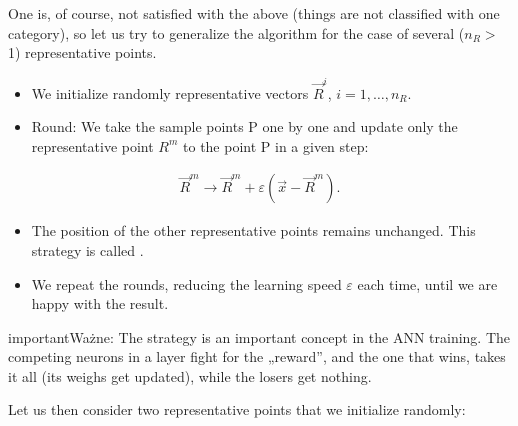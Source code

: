 \documentclass[a4paper,12pt,polish]{jupyterBook}
\begin{document}
\sphinxAtStartPar
One is, of course, not satisfied with the above (things are not classified with one category), so let us try to generalize the algorithm for the case of several (\( n_R> \) 1) representative points.
\begin{itemize}
\item {} 
\sphinxAtStartPar
We initialize randomly representative vectors \( \vec{R}^i \), \(i = 1, \dots, n_R \).

\item {} 
\sphinxAtStartPar
Round: We take the sample points P one by one and update only the  representative point \(R^m\) to the point P in a given step:

\end{itemize}
\begin{equation*}
\begin{split} \vec{R}^m \to \vec{R}^m + \varepsilon (\vec{x} - \vec{R}^m). \end{split}
\end{equation*}\begin{itemize}
\item {} 
\sphinxAtStartPar
The position of the other representative points remains unchanged. This strategy is called .

\item {} 
\sphinxAtStartPar
We repeat the rounds, reducing the learning speed \( \varepsilon \) each time, until we are happy with the result.

\end{itemize}

\begin{sphinxadmonition}{important}{Ważne:}
\sphinxAtStartPar
The  strategy is an important concept in the ANN training. The competing neurons in a layer fight for the „reward”, and the one that wins, takes it all (its weighs get updated), while the losers get nothing.
\end{sphinxadmonition}

\sphinxAtStartPar
Let us then consider two representative points that we initialize randomly:
\begin{sphinxVerbatimInput}

\begin{sphinxVerbatim}[commandchars=\\\{\}]
\PYG{p}{[} \PYG{p}{]}
\PYG{p}{[} \PYG{p}{]}
\end{sphinxVerbatim}
\end{sphinxVerbatimInput}
\end{document}
